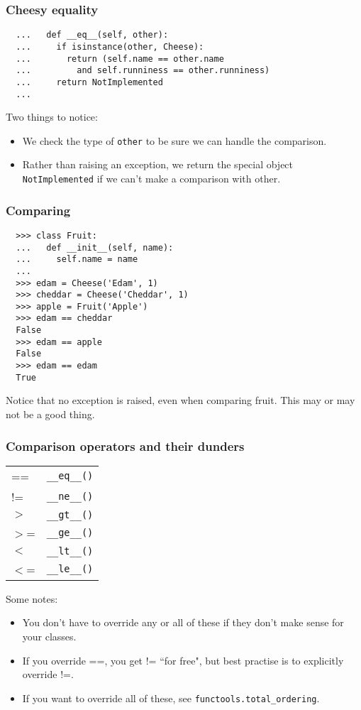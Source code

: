 \documentclass[aspectratio=169]{beamer}
\begin{document}
\begin{frame}[fragile]
  \frametitle{Cheesy equality}
  
  \begin{Verbatim}
  ...   def __eq__(self, other):
  ...     if isinstance(other, Cheese):
  ...       return (self.name == other.name 
  ...         and self.runniness == other.runniness)
  ...     return NotImplemented
  ...      
  \end{Verbatim}
  
  \bigbreak
  Two things to notice:
  \begin{itemize}
    \item We check the type of \texttt{other} to be sure we can handle the comparison.
    \item Rather than raising an exception, we return the special object \texttt{NotImplemented} if we can't make a comparison with other.
  \end{itemize}
 \end{frame}

\begin{frame}[fragile]
  \frametitle{Comparing}
  
  \begin{Verbatim}
  >>> class Fruit:
  ...   def __init__(self, name):
  ...     self.name = name
  ...
  >>> edam = Cheese('Edam', 1)
  >>> cheddar = Cheese('Cheddar', 1)
  >>> apple = Fruit('Apple')
  >>> edam == cheddar
  False
  >>> edam == apple
  False
  >>> edam == edam
  True
  \end{Verbatim}
  
  \bigbreak
  Notice that no exception is raised, even when comparing fruit. This may or may not be a good thing.
 \end{frame}
 
\begin{frame}
  \frametitle{Comparison operators and their dunders}
  

\begin{tabular}{l l}
 
 ==    & \texttt{\_\_eq\_\_()} \\ 
 !=    & \texttt{\_\_ne\_\_()} \\ 
 $>$  & \texttt{\_\_gt\_\_()} \\ 
 $>$=    & \texttt{\_\_ge\_\_()} \\ 
 $<$   & \texttt{\_\_lt\_\_()} \\ 
  $<$=  & \texttt{\_\_le\_\_()} \\ 
\end{tabular}

Some notes:
\begin{itemize}
  \item You don't have to override any or all of these if they don't make sense for your classes.
  \item If you override ==, you get != ``for free", but best practise is to explicitly override !=.
  \item If you want to override all of these, see \texttt{functools.total\_ordering}.
\end{itemize}
\end{frame} 
\end{document}
